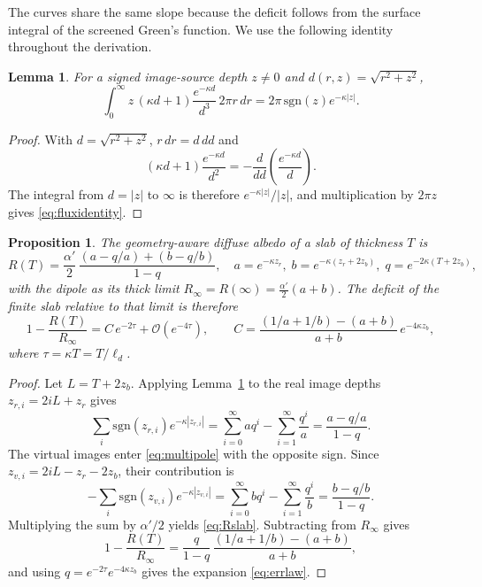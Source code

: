 \documentclass[11pt]{article}
\newtheorem{lemma}{Lemma}
\newtheorem{proposition}{Proposition}
\newcommand{\ld}{\ell_d}
\begin{document}
The curves share the same slope because the deficit follows from the
surface integral of the screened Green's function. We use the following identity
throughout the derivation.

\begin{lemma}
\label{lem:flux}
For a signed image-source depth $z\ne0$ and $d(r,z)=\sqrt{r^2+z^2}$,
\begin{equation}
\int_0^\infty z\,(\kappa d+1)\frac{e^{-\kappa d}}{d^3}\,2\pi r\,dr
=2\pi\,\mathrm{sgn}(z)e^{-\kappa |z|}.
\label{eq:fluxidentity}
\end{equation}
\end{lemma}

\begin{proof}
With $d=\sqrt{r^2+z^2}$, $r\,dr=d\,dd$ and
\[
(\kappa d+1)\frac{e^{-\kappa d}}{d^2}
=-\frac{d}{dd}\left(\frac{e^{-\kappa d}}{d}\right).
\]
The integral from $d=|z|$ to $\infty$ is therefore $e^{-\kappa |z|}/|z|$,
and multiplication by $2\pi z$ gives \eqref{eq:fluxidentity}.
\end{proof}

\begin{proposition}
\label{prop:law}
The geometry-aware diffuse albedo of a slab of thickness $T$ is
\begin{equation}
R(T)=\frac{\alpha'}{2}\,
\frac{(a-q/a)+(b-q/b)}{1-q},\quad
a=e^{-\kappa z_r},\; b=e^{-\kappa(z_r+2z_b)},\; q=e^{-2\kappa(T+2z_b)},
\label{eq:Rslab}
\end{equation}
with the dipole as its thick limit $R_\infty=R(\infty)=\tfrac{\alpha'}{2}(a+b)$. The
deficit of the finite slab relative to that limit is therefore
\begin{equation}
1-\frac{R(T)}{R_\infty}=C\,e^{-2\tau}+\mathcal{O}(e^{-4\tau}),\qquad
C=\frac{(1/a+1/b)-(a+b)}{a+b}\,e^{-4\kappa z_b},
\label{eq:errlaw}
\end{equation}
where $\tau=\kappa T=T/\ld$.
\end{proposition}

\begin{proof}
Let $L=T+2z_b$. Applying Lemma~\ref{lem:flux} to the real image depths
$z_{r,i}=2iL+z_r$ gives
\[
\sum_i \mathrm{sgn}(z_{r,i})e^{-\kappa |z_{r,i}|}
=\sum_{i=0}^{\infty}a q^i-\sum_{i=1}^{\infty}\frac{q^i}{a}
=\frac{a-q/a}{1-q}.
\]
The virtual images enter \eqref{eq:multipole} with the opposite sign. Since
$z_{v,i}=2iL-z_r-2z_b$, their contribution is
\[
-\sum_i \mathrm{sgn}(z_{v,i})e^{-\kappa |z_{v,i}|}
=\sum_{i=0}^{\infty}b q^i-\sum_{i=1}^{\infty}\frac{q^i}{b}
=\frac{b-q/b}{1-q}.
\]
Multiplying the sum by $\alpha'/2$ yields \eqref{eq:Rslab}. Subtracting from
$R_\infty$ gives
\[
1-\frac{R(T)}{R_\infty}
=\frac{q}{1-q}\,
\frac{(1/a+1/b)-(a+b)}{a+b},
\]
and using $q=e^{-2\tau}e^{-4\kappa z_b}$ gives the expansion
\eqref{eq:errlaw}.
\end{proof}
\end{document}
